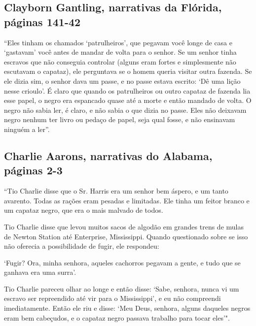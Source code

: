 \subsection{Clayborn Gantling, narrativas da Flórida, páginas 141-42} \label{ref99}

``Eles tinham os chamados `patrulheiros', que pegavam você longe de casa
e `gastavam' você antes de mandar de volta para o senhor. Se um senhor
tinha escravos que não conseguia controlar (alguns eram fortes e
simplesmente não escutavam o capataz), ele perguntava se o homem queria
visitar outra fazenda. Se ele dizia sim, o senhor dava um passe, e no
passe estava escrito: `Dê uma lição nesse crioulo'. É claro que quando
os patrulheiros ou outro capataz de fazenda lia esse papel, o negro era
espancado quase até a morte e então mandado de volta. O negro não sabia
ler, é claro, e não sabia o que dizia no passe. Eles não deixavam negro
nenhum ter livro ou pedaço de papel, seja qual fosse, e não ensinavam
ninguém a ler''.

\subsection{Charlie Aarons, narrativas do Alabama, páginas 2-3} \label{ref01}

``Tio Charlie disse que o Sr. Harris era um senhor bem áspero, e um
tanto avarento. Todas as rações eram pesadas e limitadas. Ele tinha um
feitor branco e um capataz negro, que era o mais malvado de todos.

Tio Charlie disse que levou muitos sacos de algodão em grandes trens de
mulas de Newton Station até Enterprise, Mississippi. Quando questionado
sobre se isso não oferecia a possibilidade de fugir, ele respondeu:

`Fugir? Ora, minha senhora, aqueles cachorros pegavam a gente, e tudo
que se ganhava era uma surra'.

Tio Charlie pareceu olhar ao longe e então disse: `Sabe, senhora, nunca
vi um escravo ser repreendido até vir para o Mississippi', e eu não
compreendi imediatamente. Então ele riu e disse: `Meu Deus, senhora,
alguns daqueles negros eram bem cabeçudos, e o capataz negro passava
trabalho para tocar eles'".

